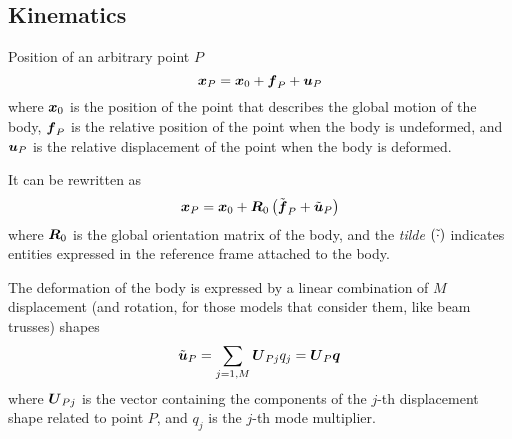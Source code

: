 %
%
%
%
%
% 
%
%

\subsection{Kinematics}
Position of an arbitrary point $P$
\begin{equation}
	\boldsymbol{x}_P = \boldsymbol{x}_0 + \boldsymbol{f}_P + \boldsymbol{u}_P
\end{equation}
where $\boldsymbol{x}_0$ is the position of the point that describes the global
motion of the body,
$\boldsymbol{f}_P$ is the relative position of the point when the body 
is undeformed,
and $\boldsymbol{u}_P$ is the relative displacement of the point when the body
is deformed.

It can be rewritten as
\begin{equation}
	\boldsymbol{x}_P = \boldsymbol{x}_0 + \boldsymbol{R}_0\left( \tilde{\boldsymbol{f}}_P + \tilde{\boldsymbol{u}}_P \right)
\end{equation}
where $\boldsymbol{R}_0$ is the global orientation matrix of the body,
and the \emph{tilde} $\left( \tilde{\cdot} \right)$ indicates entities
expressed in the reference frame attached to the body.

The deformation of the body is expressed by a linear combination
of $M$ displacement (and rotation, for those models that consider
them, like beam trusses) shapes
\begin{equation}
	\tilde{\boldsymbol{u}}_P = \sum_{j=1,M} \boldsymbol{U}_{Pj} q_j = \boldsymbol{U}_P \boldsymbol{q}
\end{equation}
where $\boldsymbol{U}_{Pj}$ is the vector containing the components
of the $j$-th displacement shape related to point $P$,
and $q_j$ is the $j$-th mode multiplier.

